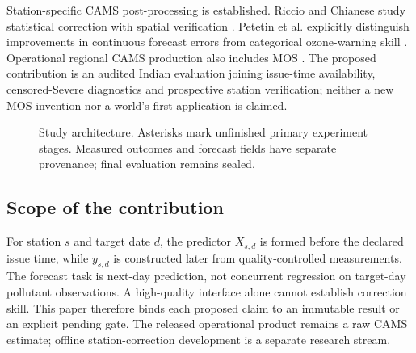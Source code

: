 \documentclass[journal]{IEEEtran}
\begin{document}
Station-specific CAMS post-processing is established. Riccio and Chianese
study statistical correction with spatial verification \cite{riccio2024mos}.
Petetin et al. explicitly distinguish improvements in continuous forecast
errors from categorical ozone-warning skill \cite{petetin2022mos}.
Operational regional CAMS production also includes MOS \cite{colette2025cams}.
The proposed contribution is an audited Indian evaluation joining issue-time
availability, censored-Severe diagnostics and prospective station verification;
neither a new MOS invention nor a world's-first application is claimed.
\begin{figure}[h]\centering
{}
\caption{Study architecture. Asterisks mark unfinished primary experiment stages. Measured outcomes and forecast fields have separate provenance; final evaluation remains sealed.}
\end{figure}
\subsection{Scope of the contribution}
For station $s$ and target date $d$, the predictor $X_{s,d}$ is formed
before the declared issue time, while $y_{s,d}$ is constructed later from
quality-controlled measurements. The forecast task is next-day prediction,
not concurrent regression on target-day pollutant observations. A high-quality
interface alone cannot establish correction skill. This paper therefore
binds each proposed claim to an immutable result or an explicit pending gate.
The released operational product remains a raw CAMS estimate; offline
station-correction development is a separate research stream.
\end{document}
